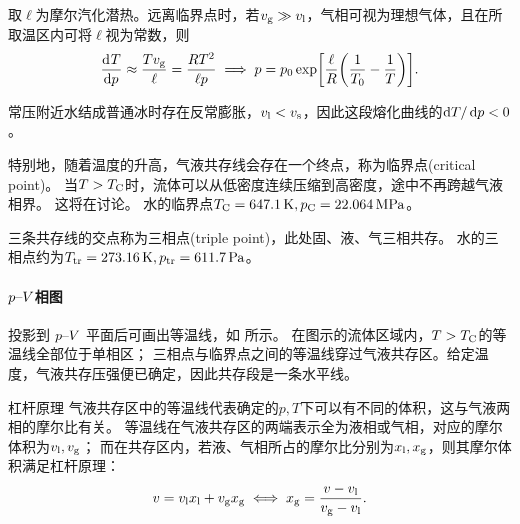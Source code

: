 \begin{corollary}
	取$\ell$为摩尔汽化潜热。远离临界点时，若$v_\gas \gg v_\liquid$，气相可视为理想气体，且在所取温区内可将$\ell$视为常数，则
	\begin{equation}
		\label{eq:sm-integrated-clausius-clapeyron}
		\dv Tp \approx \frac{Tv_\gas}\ell = \frac{RT^2}{\ell p} \implies p = p_0\exp\biggb{\frac\ell{R}\biggp{\frac1{T_0} - \frac1T}}.
	\end{equation}
	
\end{corollary}

\begin{remark}
	常压附近水结成普通冰时存在反常膨胀，$v_\liquid < v_\solid$，因此这段熔化曲线的$\d T/\d p < 0$。
\end{remark}

\begin{notecaptionblock}
	\label{fig:H2O phase P-T}
\end{notecaptionblock}

特别地，随着温度的升高，气液共存线会存在一个终点，称为临界点(critical point)。
当$T > T_\criticalpoint$时，流体可以从低密度连续压缩到高密度，途中不再跨越气液相界。
这将在讨论。
水的临界点$T_\criticalpoint = \qty{647.1}{K},p_\criticalpoint = \qty{22.064}{MPa}$。

三条共存线的交点称为三相点(triple point)，此处固、液、气三相共存。
水的三相点约为$T_\triplepoint = \qty{273.16}{K},p_\triplepoint = \qty{611.7}{Pa}$。

\paragraph{$p\vs V$相图}

投影到 $p\vs V$ 平面后可画出等温线，如 所示。
在图示的流体区域内，$T > T_\criticalpoint$的等温线全部位于单相区；
三相点与临界点之间的等温线穿过气液共存区。给定温度，气液共存压强便已确定，因此共存段是一条水平线。

\begin{example}
	{杠杆原理}{}
	气液共存区中的等温线代表确定的$p,T$下可以有不同的体积，这与气液两相的摩尔比有关。
	等温线在气液共存区的两端表示全为液相或气相，对应的摩尔体积为$v_\liquid,v_\gas$；
	而在共存区内，若液、气相所占的摩尔比分别为$x_\liquid,x_\gas$，则其摩尔体积满足杠杆原理：
	\begin{equation}
		\label{eq:sm-lever-rule}
		v = v_\liquid x_\liquid + v_\gas x_\gas \iff x_\gas = \frac{v - v_\liquid}{v_\gas - v_\liquid}.
	\end{equation}
\end{example}

